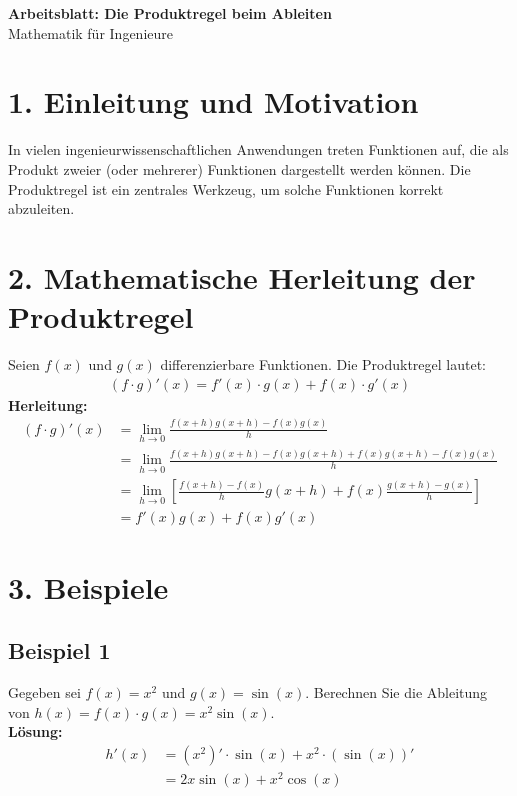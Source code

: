 
% 

\begin{center}
    {\textbf{Arbeitsblatt: Die Produktregel beim Ableiten}} \\[1em]
    {Mathematik für Ingenieure}
\end{center}

\section*{1. Einleitung und Motivation}
In vielen ingenieurwissenschaftlichen Anwendungen treten Funktionen auf, die als Produkt zweier (oder mehrerer) Funktionen dargestellt werden können. Die Produktregel ist ein zentrales Werkzeug, um solche Funktionen korrekt abzuleiten.

\section*{2. Mathematische Herleitung der Produktregel}
Seien $f(x)$ und $g(x)$ differenzierbare Funktionen. Die Produktregel lautet:
\begin{align*}
    (f \cdot g)'(x) = f'(x) \cdot g(x) + f(x) \cdot g'(x)
\end{align*}
\textbf{Herleitung:}
\begin{align*}
    (f \cdot g)'(x) &= \lim_{h \to 0} \frac{f(x+h)g(x+h) - f(x)g(x)}{h} \\
    &= \lim_{h \to 0} \frac{f(x+h)g(x+h) - f(x)g(x+h) + f(x)g(x+h) - f(x)g(x)}{h} \\
    &= \lim_{h \to 0} \left[ \frac{f(x+h)-f(x)}{h}g(x+h) + f(x)\frac{g(x+h)-g(x)}{h} \right] \\
    &= f'(x)g(x) + f(x)g'(x)
\end{align*}

\section*{3. Beispiele}
\subsection*{Beispiel 1}
Gegeben sei $f(x) = x^2$ und $g(x) = \sin(x)$. Berechnen Sie die Ableitung von $h(x) = f(x) \cdot g(x) = x^2 \sin(x)$.
\\
\textbf{Lösung:}
\begin{align*}
    h'(x) &= (x^2)' \cdot \sin(x) + x^2 \cdot (\sin(x))' \\
    &= 2x \sin(x) + x^2 \cos(x)
\end{align*}


